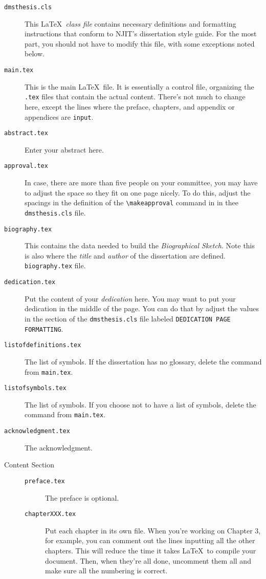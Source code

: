 \begin{description}
  \item[\texttt{dmsthesis.cls}] This \LaTeX\ \emph{class file} contains necessary definitions and formatting instructions that conform to NJIT's dissertation style guide. For the most part, you should not have to modify this file, with some exceptions noted below.
%
  \item[\texttt{main.tex}] This is the main \LaTeX\ file. It is essentially a control file, organizing the \texttt{.tex} files that contain the actual content. There's not much to change here, except the lines where the preface, chapters, and appendix or appendices are \texttt{input}.
%
  \item[\texttt{abstract.tex}] Enter your abstract here.
%
  \item[\texttt{approval.tex}]   In case, there are more than five people on your committee, you may have to adjust the space so they fit on one page nicely.  To do this, adjust the spacings in the definition of the \verb+\makeapproval+ command in in thee \verb#dmsthesis.cls# file.
%
  \item[\texttt{biography.tex}] This contains the data needed to build the \emph{Biographical Sketch}. Note this is also where the \emph{title} and \emph{author} of the dissertation are defined.  
\verb#biography.tex# file.
%
  \item[\texttt{dedication.tex}] Put the content of your \emph{dedication} here. You may want to put your dedication in the middle of the page.  You can do that by adjust the values in the section of the \texttt{dmsthesis.cls} file labeled \texttt{DEDICATION PAGE FORMATTING}.
%
  \item[\texttt{listofdefinitions.tex}] The list of symbols. If the dissertation has no glossary, delete the command \verb++ from \texttt{main.tex}.
%
  \item[\texttt{listofsymbols.tex}] The list of symbols. If you choose not to have a list of symbols, delete the command \verb++ from \texttt{main.tex}.
%
  \item[\texttt{acknowledgment.tex}] The acknowledgment.
%
  \item[Content Section] \phantom{hello}
  \begin{description}
    \item[\texttt{preface.tex}] The preface is optional.
%
	\item[\texttt{chapterXXX.tex}] Put each chapter in its own file. When you're working on Chapter 3, for example, you can comment out the lines inputting all the other chapters. This will reduce the time it takes \LaTeX\ to compile your document. Then, when they're all done, uncomment them all and make sure all the numbering is correct.

\end{description}
\end{description}
